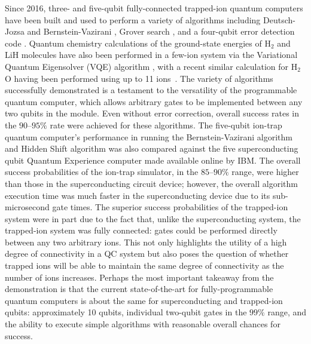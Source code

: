 \documentclass[%
12pt,
 amsmath,amssymb,
]{revtex4-2}
\begin{document}
Since 2016, three- and five-qubit fully-connected trapped-ion quantum computers have been built \cite{Debnath5QubitComp2016} and used to perform a variety of algorithms including Deutsch-Jozsa and Bernstein-Vazirani \cite{Debnath5QubitComp2016}, Grover search \cite{FiggattGroverSearch2017}, and a four-qubit error detection code \cite{LinkeErrorDetection2017}. Quantum chemistry calculations of the ground-state energies of $\textrm{H}_2$ and LiH molecules have also been performed in a few-ion system via the Variational Quantum Eigensolver (VQE) algorithm \cite{HempelVQE2018}, with a recent similar calculation for H$_{2}$O having been performed using up to 11 ions~\cite{NamWaterMolecule2019}. The variety of algorithms successfully demonstrated is a testament to the versatility of the programmable quantum computer, which allows arbitrary gates to be implemented between any two qubits in the module. Even without error correction, overall success rates in the $90$--$95\%$ rate were achieved for these algorithms. The five-qubit ion-trap quantum computer's performance in running the Bernstein-Vazirani algorithm and Hidden Shift algorithm was also compared against the five superconducting qubit Quantum Experience computer \cite{IBMQuantumExperience} made available online by IBM. The overall success probabilities of the ion-trap simulator, in the $85$--$90 \%$ range, were higher than those in the superconducting circuit device; however, the overall algorithm execution time was much faster in the superconducting device due to its sub-microsecond gate times. The superior success probabilities of the trapped-ion system were in part due to the fact that, unlike the superconducting system, the trapped-ion system was fully connected: gates could be performed directly between any two arbitrary ions. This not only highlights the utility of a high degree of connectivity in a QC system but also poses the question of whether trapped ions will be able to maintain the same degree of connectivity as the number of ions increases. Perhaps the most important takeaway from the demonstration is that the current state-of-the-art for fully-programmable quantum computers is about the same for superconducting and trapped-ion qubits: approximately 10 qubits, individual two-qubit gates in the $99\%$ range, and the ability to execute simple algorithms with reasonable overall chances for success.
\end{document}
